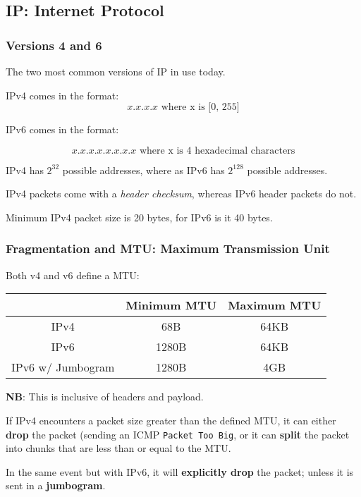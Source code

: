 \documentclass{article}
\begin{document}
\subsection{IP: Internet Protocol}

\subsubsection{Versions 4 and 6}

The two most common versions of IP in use today.

IPv4 comes in the format:
\[ x.x.x.x \text{ where x is [0, 255]}\]

IPv6 comes in the format:

\[ x.x.x.x.x.x.x.x \text{ where x is 4 hexadecimal characters} \]

IPv4 has $2^{32}$ possible addresses, where as IPv6 has $2^{128}$ possible addresses.

IPv4 packets come with a \textit{header checksum}, whereas IPv6 header packets do not.

Minimum IPv4 packet size is 20 bytes, for IPv6 is it 40 bytes.

\subsubsection{Fragmentation and MTU: Maximum Transmission Unit}

Both v4 and v6 define a MTU:

\begin{center}
  \begin{tabular}{|c|c|c|}
    \hline
    & Minimum MTU & Maximum MTU\\
    \hline\hline
    IPv4 & 68B & 64KB\\
    \hline
    IPv6 & 1280B & 64KB\\
    \hline
    IPv6 w/ Jumbogram & 1280B & 4GB\\
    \hline
  \end{tabular}
\end{center}

\textbf{NB}: This is inclusive of headers and payload.

If IPv4 encounters a packet size greater than the defined MTU, it can either \textbf{drop} the packet (sending an ICMP \texttt{Packet Too Big}, or it can \textbf{split} the packet into chunks that are less than or equal to the MTU.

In the same event but with IPv6, it will \textbf{explicitly drop} the packet; unless it is sent in a \textbf{jumbogram}.
\end{document}

